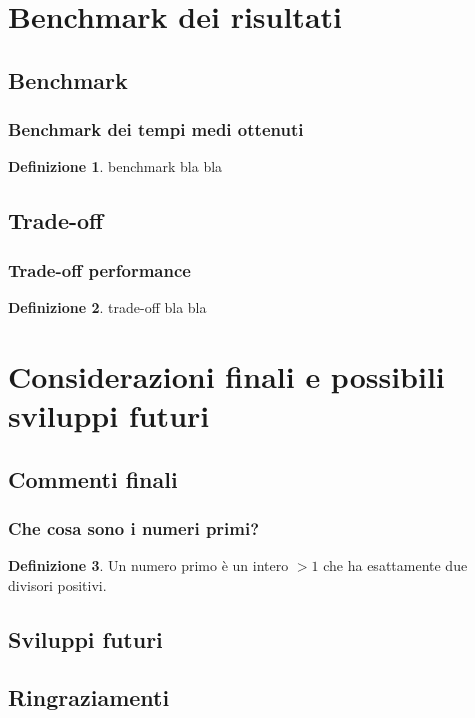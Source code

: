 \documentclass{beamer}
\theoremstyle{definition}
\newtheorem{definizione}{Definizione}
\theoremstyle{plain}
\begin{document}
\section{Benchmark dei risultati}

\subsection{Benchmark}
\begin{frame}
\frametitle{Benchmark dei tempi medi ottenuti}
\begin{definizione}
 \alert{benchmark} bla bla
\end{definizione}
\end{frame}

\subsection{Trade-off}
\begin{frame}
\frametitle{Trade-off performance}
\begin{definizione}
\alert{trade-off} bla bla
\end{definizione}
\end{frame}

\section{Considerazioni finali e possibili sviluppi futuri}
\subsection{Commenti finali}
\begin{frame}
\frametitle{Che cosa sono i numeri primi?}
\begin{definizione}
Un \alert{numero primo} è un intero $>1$ che ha esattamente
due divisori positivi.
\end{definizione}
\end{frame}
\subsection{Sviluppi futuri}
\subsection{Ringraziamenti}
\end{document}
